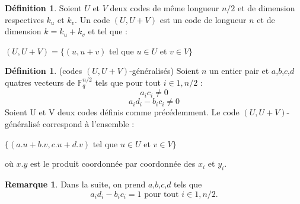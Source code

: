 \documentclass[12pt]{article}
\theoremstyle{definition}
\newtheorem{remarque}[thm]{Remarque}
\newtheorem{defi}[thm]{Définition}
\newcommand{\F}{\mathbb{F}}
\begin{document}
\begin{defi} Soient $U$ et $V$ deux codes de même longueur $n/2$ et de dimension respectives $k_u$ et $k_v$. Un code $(U,U+V)$ est un code de longueur $n$ et de dimension $k=k_u+k_v$ et tel que :
\begin{center}
$(U,U+V) = \{(u,u+v)$ tel que $u \in U$ et $v \in V \}$
\end{center}
\end{defi}

\begin{defi} \label{UV-normalise} (codes $(U,U+V)$-généralisés) Soient $n$ un entier pair et $a$,$b$,$c$,$d$ quatres vecteurs de $\F_q^{n/2}$ tels que pour tout $i \in {1,n/2}$ :
$$ a_ic_i \neq 0 $$
$$ a_id_i - b_ic_i \neq 0 $$
Soient U et V deux codes définis comme précédemment. Le code $(U,U+V)$-généralisé correspond à l'ensemble :
\begin{center}
$\{(a.u + b.v, c.u + d.v)$ tel que $u \in U$ et $v \in V \}$
\end{center}
où $x.y$ est le produit coordonnée par coordonnée des $x_i$ et $y_i$.
\end{defi}

\begin{remarque}
Dans la suite, on prend $a$,$b$,$c$,$d$ tels que 
$$ a_id_i - b_ic_i = 1 \text{ pour tout } i \in {1,n/2}.$$ 
\end{remarque}
\end{document}
